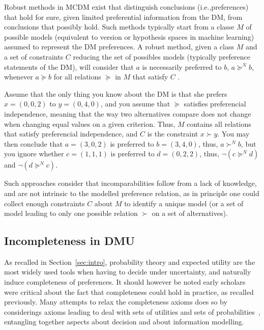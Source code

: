 \documentclass[french, english]{llncs}
\begin{document}
	Robust methods in MCDM exist that distinguish conclusions (i.e.,preferences) that hold for sure, given limited preferential information from the \ac{DM}, from conclusions that possibly hold. Such methods typically start from a classe $M$ of possible models (equivalent to version or hypothesis spaces in machine learning) assumed to represent the \ac{DM} preferences. A robust method, given a class $M$ and a set of constraints $C$ reducing the set of possibles models (typically preference statements of the \ac{DM}), will consider that $a$ is necessarily preferred to $b$, $a \succeq^N b$, whenever $a \succeq b$ for all relations $\succeq$ in $M$ that satisfy $C$ \citep{greco_ordinal_2008}.
	\begin{example} Assume that the only thing you know about the \ac{DM} is that she prefers $x = (0, 0, 2)$ to $y = (0, 4, 0)$, and you assume that $\succeq$ satisfies preferencial independence, meaning that the way two alternatives compare does not change when changing equal values on a given criterion. Thus, $M$ contains all relations that satisfy preferencial independence, and $C$ is the constraint $x \succ y$. You may then conclude that $a = (3, 0, 2)$ is preferred to $b = (3, 4, 0)$, thus, $a \succ^N b$, but you ignore whether $c = (1, 1, 1)$ is preferred to $d = (0, 2, 2)$, thus, $¬(c \succeq^N d)$ and $¬(d \succeq^N c)$.
	\end{example} 
Such approaches consider that incomparabilities follow from a lack of knowledge, and are not intrinsic to the modelled preference relation, as in principle one could collect enough constraints $C$ about $M$ to identify a unique model (or a set of model leading to only one possible relation $\succ$ on a set of alternatives).
	
	\subsection{Incompleteness in DMU}
	
	As recalled in Section~\ref{sec:intro}, probability theory and expected utility are the most widely used tools when having to decide under uncertainty, and naturally induce completeness of preferences. It should however be noted early scholars were critical about the fact that completeness could hold in practice, as recalled previously. Many attempts to relax the completeness axioms does so by considerings axioms leading to deal with sets of utilities and sets of probabilities~\cite{aumann_utility_1962}, entangling together aspects about decision and about information modelling. 
	
\end{document}
